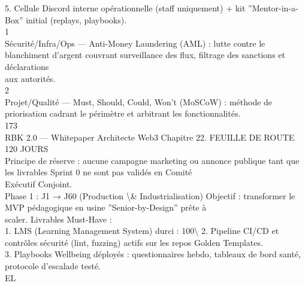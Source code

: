 \vspace{0.5em}
5. Cellule Discord interne opérationnelle (staff uniquement) + kit ”Mentor-in-a-Box” initial (replays, playbooks).\\
1\\
Sécurité/Infra/Ops — Anti-Money Laundering (AML) : lutte contre le blanchiment d’argent couvrant surveillance des flux, filtrage des sanctions et déclarations\\
aux autorités.\\
2\\
Projet/Qualité — Must, Should, Could, Won’t (MoSCoW) : méthode de priorisation cadrant le périmètre et arbitrant les fonctionnalités.\\
\vspace{0.5em}
\vspace{0.5em}
173\\
RBK 2.0 — Whitepaper Architecte Web3                                                               Chapitre 22. FEUILLE DE ROUTE 120 JOURS\\
\vspace{0.5em}
\vspace{0.5em}
Principe de réserve : aucune campagne marketing ou annonce publique tant que les livrables Sprint 0 ne sont pas validés en Comité\\
Exécutif Conjoint.\\
\vspace{0.5em}
Phase 1 : J1 → J60 (Production \textbackslash{}& Industrialisation)       Objectif : transformer le MVP pédagogique en usine ”Senior-by-Design” prête à\\
scaler. Livrables Must-Have :\\
\vspace{0.5em}
1. LMS (Learning Management System) durci : 100\textbackslash{}%
\vspace{0.5em}
2. Pipeline CI/CD et contrôles sécurité (lint, fuzzing) actifs sur les repos Golden Templates.\\
\vspace{0.5em}
3. Playbooks Wellbeing déployés : questionnaires hebdo, tableaux de bord santé, protocole d’escalade testé.\\
\vspace{0.5em}
\vspace{0.5em}
\vspace{0.5em}
\vspace{0.5em}
EL\\

